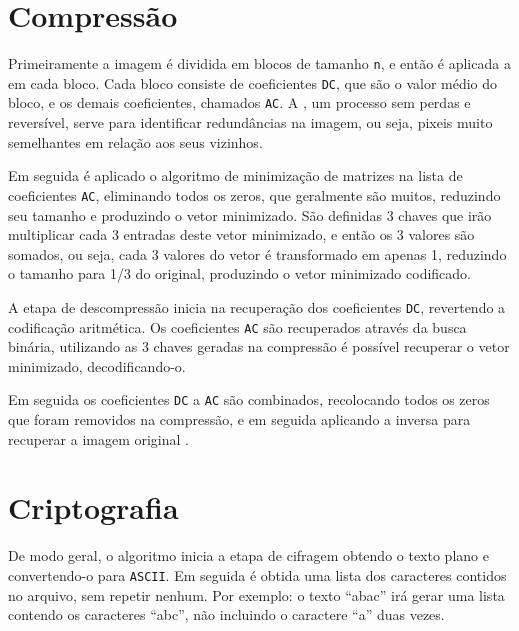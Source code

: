 \section{Compressão}

Primeiramente a imagem é dividida em blocos de tamanho \texttt{n}, e então é aplicada a \dct em cada bloco. Cada bloco consiste de coeficientes \texttt{DC}, que são o valor médio do bloco, e os demais coeficientes, chamados \texttt{AC}. A \dct, um processo sem perdas e reversível, serve para identificar redundâncias na imagem, ou seja, pixeis muito semelhantes em relação aos seus vizinhos.

Em seguida é aplicado o algoritmo de minimização de matrizes na lista de coeficientes \texttt{AC}, eliminando todos os zeros, que geralmente são muitos, reduzindo seu tamanho e produzindo o vetor minimizado. São definidas 3 chaves que irão multiplicar cada 3 entradas deste vetor minimizado, e então os 3 valores são somados, ou seja, cada 3 valores do vetor é transformado em apenas 1, reduzindo o tamanho para 1/3 do original, produzindo o vetor minimizado codificado.

A etapa de descompressão inicia na recuperação dos coeficientes \texttt{DC}, revertendo a codificação aritmética. Os coeficientes \texttt{AC} são recuperados através da busca binária, utilizando as 3 chaves geradas na compressão é possível recuperar o vetor minimizado, decodificando-o.

Em seguida os coeficientes \texttt{DC} a \texttt{AC} são combinados, recolocando todos os zeros que foram removidos na compressão, e em seguida aplicando a \dct inversa para recuperar a imagem original \cite{shu13715}.

\section{Criptografia}

De modo geral, o algoritmo \gmpr inicia a etapa de cifragem obtendo o texto plano e convertendo-o para \texttt{ASCII}. Em seguida é obtida uma lista dos caracteres contidos no arquivo, sem repetir nenhum. Por exemplo: o texto ``abac'' irá gerar uma lista contendo os caracteres ``abc'', não incluindo o caractere ``a'' duas vezes.

